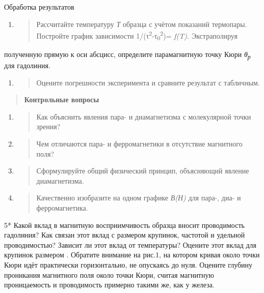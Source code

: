 \documentclass[]{article}
\begin{document}
Обработка результатов

\begin{enumerate}
\def\labelenumi{\arabic{enumi}.}
\item
  \begin{quote}
  Рассчитайте температуру \emph{Т} образца с учётом показаний
  термопары.\\
  Постройте график зависимости
  1/(τ\textsuperscript{2}-τ\textsubscript{0}\textsuperscript{2})=
  \emph{f(T).} Экстраполируя
  \end{quote}
\end{enumerate}

по­лученную прямую к оси абсцисс, определите парамагнитную точку Кю­ри
\emph{θ\textsubscript{р}} для гадолиния.

\begin{enumerate}
\def\labelenumi{\arabic{enumi}.}
\item
  \begin{quote}
  Оцените погрешности эксперимента и сравните результат с табличным.
  \end{quote}
\end{enumerate}

\begin{quote}
\textbf{Контрольные вопросы}
\end{quote}

\begin{enumerate}
\def\labelenumi{\arabic{enumi}.}
\item
  \begin{quote}
  Как объяснить явления пара- и диамагнетизма с молекулярной точки
  зре­ния?
  \end{quote}
\item
  \begin{quote}
  Чем отличаются пара- и ферромагнетики в отсутствие магнитного поля?
  \end{quote}
\item
  \begin{quote}
  Сформулируйте общий физический принцип, объясняющий явление
  диа­магнетизма.
  \end{quote}
\item
  \begin{quote}
  Качественно изобразите на одном графике \emph{В(Н)} для пара-, диа- и
  ферро­магнетика.
  \end{quote}
\end{enumerate}

5* Какой вклад в магнитную восприимчивость образца вносит проводимость
гадолиния? Как связан этот вклад с размером крупинок, частотой и
удельной проводимостью? Зависит ли этот вклад от температуры? Оцените
этот вклад для крупинок размером . Обратите внимание на рис.1, на
котором кривая около точки Кюри идёт практически горизонтально, не
опускаясь до нуля. Оцените глубину проникания магнитного поля около
точки Кюри, считая магнитную проницаемость и проводимость примерно
такими же, как у железа.
\end{document}
